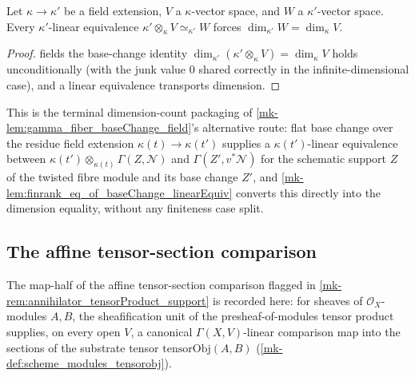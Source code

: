 \begin{lemma}\label{mk-lem:finrank_eq_of_baseChange_linearEquiv}
  \leanok

  Let \(\kappa \to \kappa'\) be a field extension, \(V\) a \(\kappa\)-vector
  space, and \(W\) a \(\kappa'\)-vector space. Every \(\kappa'\)-linear
  equivalence \(\kappa' \otimes_\kappa V \simeq_{\kappa'} W\) forces
  \(\dim_{\kappa'} W = \dim_\kappa V\).
\end{lemma}
\begin{proof}
  \leanokOver fields the base-change identity
  \(\dim_{\kappa'}(\kappa' \otimes_\kappa V) = \dim_\kappa V\) holds
  unconditionally (with the junk value \(0\) shared correctly in the
  infinite-dimensional case), and a linear equivalence transports dimension.
\end{proof}

\begin{remark}
  \label{mk-rem:finrank_baseChange_linearEquiv_role}
  This is the terminal dimension-count packaging of
  \ref{mk-lem:gamma_fiber_baseChange_field}'s alternative route: flat base
  change over the residue field extension \(\kappa(t) \to \kappa(t')\)
  supplies a \(\kappa(t')\)-linear equivalence between
  \(\kappa(t') \otimes_{\kappa(t)} \Gamma(Z, \mathcal N)\) and
  \(\Gamma(Z', v^*\mathcal N)\) for the schematic support \(Z\) of the
  twisted fibre module and its base change \(Z'\), and
  \ref{mk-lem:finrank_eq_of_baseChange_linearEquiv} converts this directly into
  the dimension equality, without any finiteness case split.
\end{remark}

\subsection{The affine tensor-section comparison}
\label{mk-subsec:tensor_section_formula}

The map-half of the affine tensor-section comparison flagged in
\ref{mk-rem:annihilator_tensorProduct_support} is recorded here: for sheaves
of \(\mathcal O_X\)-modules \(A, B\), the sheafification unit of the
presheaf-of-modules tensor product supplies, on every open \(V\), a
canonical \(\Gamma(X,V)\)-linear comparison map into the sections of the
substrate tensor \(\mathrm{tensorObj}(A,B)\) (\ref{mk-def:scheme_modules_tensorobj}).

